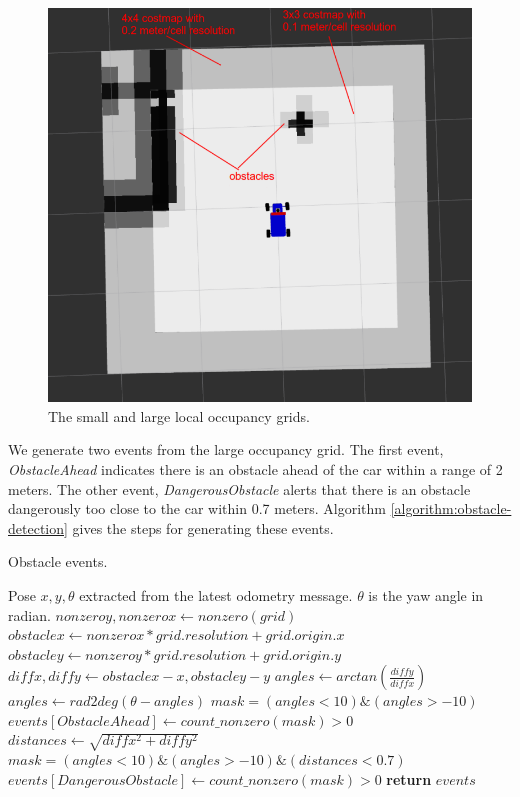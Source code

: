 \begin{figure}[h]
  \centering
  \includegraphics[width=.8\textwidth]{figures/costmaps.png}
  \caption[Occupancy grids]{The small and large local occupancy grids.}
  \label{figure:costmaps}
\end{figure}

We generate two events from the large occupancy grid. The first event,
\textit{ObstacleAhead} indicates there is an obstacle ahead of the car within a
range of 2 meters. The other event, \textit{DangerousObstacle} alerts that
there is an obstacle dangerously too close to the car within 0.7 meters.
Algorithm \ref{algorithm:obstacle-detection} gives the steps for generating
these events.

\begin{algorithm}[h]
  \caption{Obstacle events.}
  \label{algorithm:obstacle-detection}
  \begin{algorithmic}[1]
    \Require Pose $x,y,\theta$ extracted from the latest odometry message.
    $\theta$ is the yaw angle in radian.
    \State $nonzeroy, nonzerox \gets nonzero(grid)$
    \State $obstaclex \gets nonzerox * grid.resolution + grid.origin.x$
    \State $obstacley \gets nonzeroy * grid.resolution + grid.origin.y$
    \State $diffx, diffy \gets obstaclex - x, obstacley - y$
    \State $angles \gets arctan(\frac{diffy}{diffx})$
    \State $angles \gets rad2deg(\theta - angles)$
    \State $mask = (angles < 10) \& (angles > -10)$
    \State $events[ObstacleAhead] \gets count\_nonzero(mask) > 0$
    \State $distances \gets \sqrt{diffx^2 + diffy^2}$
    \State $mask = (angles < 10) \& (angles > -10) \& (distances < 0.7)$
    \State $events[DangerousObstacle] \gets count\_nonzero(mask) > 0$
    \State \textbf{return} $events$
    \EndProcedure
  \end{algorithmic}
\end{algorithm}

